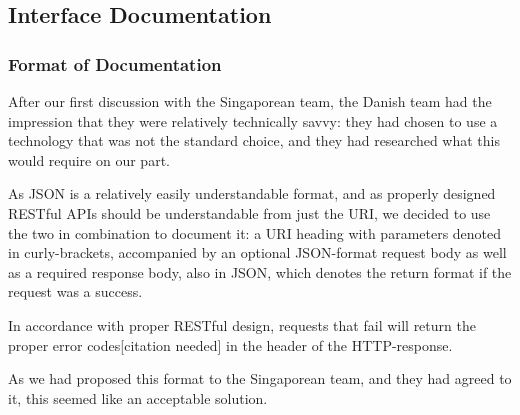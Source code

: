 \subsection{Interface Documentation}


\subsubsection{Format of Documentation}

After our first discussion with the Singaporean team, the Danish team had the impression that they were
relatively technically savvy: they had chosen to use a technology that was not the standard choice, and
they had researched what this would require on our part.

As JSON is a relatively easily understandable format, and as properly designed RESTful APIs should be
understandable from just the URI, we decided to use the two in combination to document it: a URI heading
with parameters denoted in curly-brackets, accompanied by an optional JSON-format request body as well as
a required response body, also in JSON, which denotes the return format if the request was a success.


In accordance with proper RESTful design, requests that fail will return the proper error codes[citation
needed] in the header of the HTTP-response.

As we had proposed this format to the Singaporean team, and they had agreed to it, this seemed like an
acceptable solution.

